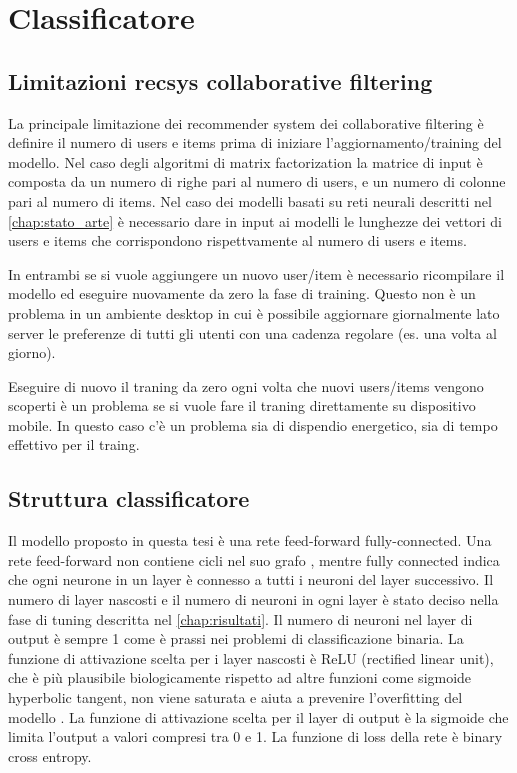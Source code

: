 \documentclass[12pt,italian]{report}
\begin{document}
% 
% 

\chapter{Classificatore}
\label{chap:classificatore}

\section{Limitazioni recsys collaborative filtering}
La principale limitazione dei recommender system dei collaborative filtering è definire il numero di users e items prima di iniziare l'aggiornamento/training del modello. Nel caso degli algoritmi di matrix factorization la matrice di input è composta da un numero di righe pari al numero di users, e un numero di colonne pari al numero di items. Nel caso dei modelli basati su reti neurali descritti nel \autoref{chap:stato_arte} è necessario dare in input ai modelli le lunghezze dei vettori di users e items che corrispondono rispettvamente al numero di users e items.

In entrambi se si vuole aggiungere un nuovo user/item è necessario ricompilare il modello ed eseguire nuovamente da zero la fase di training. Questo non è un problema in un ambiente desktop in cui è possibile aggiornare giornalmente lato server le preferenze di tutti gli utenti con una cadenza regolare (es. una volta al giorno).

Eseguire di nuovo il traning da zero ogni volta che nuovi users/items vengono scoperti è un problema se si vuole fare il traning direttamente su dispositivo mobile. In questo caso c'è un problema sia di dispendio energetico, sia di tempo effettivo per il traing.

\section{Struttura classificatore}
Il modello proposto in questa tesi è una rete feed-forward fully-connected. Una rete feed-forward non contiene cicli nel suo grafo \cite{Goodfellow-et-al-2016}, mentre fully connected indica che ogni neurone in un layer è connesso a tutti i neuroni del layer successivo. Il numero di layer nascosti e il numero di neuroni in ogni layer è stato deciso nella fase di tuning descritta nel \autoref{chap:risultati}.
Il numero di neuroni nel layer di output è sempre 1 come è prassi nei problemi di classificazione binaria. La funzione di attivazione scelta per i layer nascosti è ReLU (rectified linear unit), che è più plausibile biologicamente rispetto ad altre funzioni come sigmoide hyperbolic tangent, non viene saturata e aiuta a prevenire l'overfitting del modello \cite{rectifier-neural-networks}. La funzione di attivazione scelta per il layer di output è la sigmoide che limita l'output a valori compresi tra 0 e 1. La funzione di loss della rete è binary cross entropy.
\end{document}
